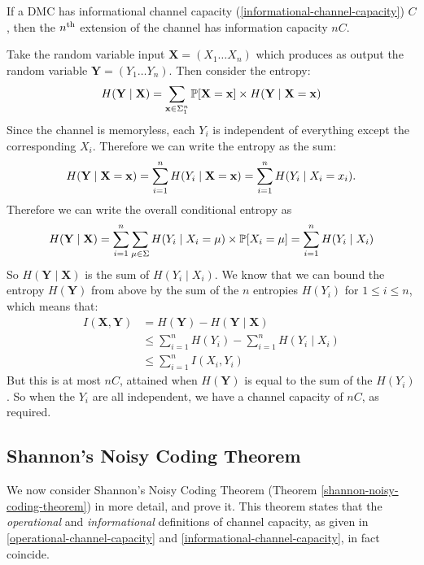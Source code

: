 \documentclass{article}
\begin{document}
\begin{proposition}
	\label{scalar-capacity-of-extension}
    If a DMC has informational channel capacity
    (\ref{informational-channel-capacity})
	$C$, then the $n\th$ extension of the channel has information capacity $nC$.
\end{proposition}
\begin{prf}
    Take the random variable input $\mathbf X = (X_1 \dots X_n)$
    which produces as output the random variable $\mathbf Y = (Y_1 \dots Y_n)$.
    Then consider the entropy:
    \[
	H(\mathbf Y \mid \mathbf X) =
	\sum_{\x \in \Sigma_1^n} \P[\mathbf X = \x]
	\times
	H(\mathbf Y \mid \mathbf X = \x)
	\]
	Since the channel is memoryless,
	each $Y_i$ is independent of everything except the corresponding $X_i$.
	Therefore we can write the entropy as the sum:
	\[
	H(\mathbf Y \mid \mathbf X = \x) =
	\sum_{i=1}^n H(Y_i \mid \mathbf X = \x) =
	\sum_{i=1}^n H(Y_i \mid X_i = x_i).
	\]
	Therefore we can write the overall conditional entropy as
	\[
	H(\mathbf Y \mid \mathbf X) =
	\sum_{i=1}^n \sum_{\mu \in \Sigma}
	H(Y_i \mid X_i = \mu) \times \P[X_i = \mu] =
	\sum_{i=1}^n H(Y_i \mid X_i)
	\]
	So $H(\mathbf Y \mid \mathbf X)$ is the sum of $H(Y_i \mid X_i)$.
	We know that we can bound the entropy $H(\mathbf Y)$ from above
	by the sum of the $n$ entropies $H(Y_i)$ for $1 \leq i \leq n$,
	which means that:
	\begin{align*}
		I(\mathbf X, \mathbf Y) &= H(\mathbf Y) - H(\mathbf Y \mid \mathbf X) \\
		&\leq \sum_{i=1}^n H(Y_i) - \sum_{i=1}^n H(Y_i \mid X_i) \\
		&\leq \sum_{i=1}^n I(X_i, Y_i) 
	\end{align*}
	But this is at most $nC$,
	attained when $H(\mathbf Y)$ is equal to the sum of the $H(Y_i)$.
	So when the $Y_i$ are all independent,
	we have a channel capacity of $nC$, as required.
\end{prf}


\subsection{Shannon's Noisy Coding Theorem}
\label{section-error-control-shannon-noisy-coding-theorem-proofs}

We now consider Shannon's Noisy Coding Theorem
(Theorem \ref{shannon-noisy-coding-theorem})
in more detail, and prove it. This theorem states that
the \textit{operational} and \textit{informational} definitions of channel capacity,
as given in \ref{operational-channel-capacity}
and \ref{informational-channel-capacity},
in fact coincide.
\end{document}

